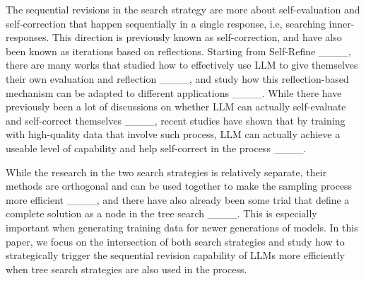 The sequential revisions in the search strategy are more about self-evaluation and self-correction that happen sequentially in a single response, i.e, searching inner-responses. This direction is previously known as self-correction, and have also been known as iterations based on reflections. Starting from Self-Refine ____, there are many works that studied how to effectively use LLM to give themselves their own evaluation and reflection ____, and study how this reflection-based mechanism can be adapted to different applications ____. While there have previously been a lot of discussions on whether LLM can actually self-evaluate and self-correct themselves ____, recent studies have shown that by training with high-quality data that involve such process, LLM can actually achieve a useable level of capability and help self-correct in the process ____. 

While the research in the two search strategies is relatively separate, their methods are orthogonal and can be used together to make the sampling process more efficient ____, and there have also already been some trial that define a complete solution as a node in the tree search ____. This is especially important when generating training data for newer generations of models. 
In this paper, we focus on the intersection of both search strategies and study how to strategically trigger the sequential revision capability of LLMs more efficiently when tree search strategies are also used in the process.